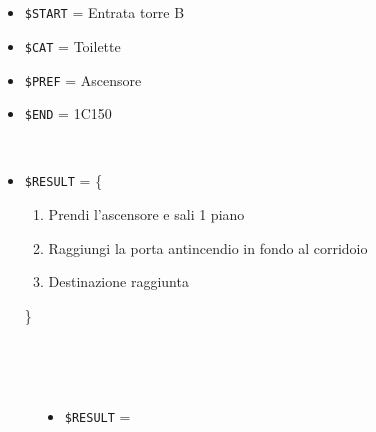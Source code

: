 \documentclass[../../SperimentazioniPratiche.tex]{subfiles}
\begin{document}
			\paragraph*{}	
			\label{2Prova2A.1}
			\begin{tcolorbox}[fonttitle=\bfseries, 
								adjusted title={\Large Prova 2A.1}, 
								breakable, 
								sharp corners=south,
								colback=white, 
								colframe=white!60!black]
								
				\begin{description}[leftmargin=0.7cm,labelwidth=!]
				
					\item[Input] \ \par 
        				\begin{itemize}
        					\item \verb|$START| = Entrata torre B
							\item \verb|$CAT| = Toilette
							\item \verb|$PREF| = Ascensore
        					\item \verb|$END| = 1C150
        				\end{itemize}
        				
        			\tcbline 
        				
        			\item[Output atteso] \ \par
        				\begin{itemize}
        					\item \verb|$RESULT| = \{
        						\begin{enumerate}
        							\item Prendi l'ascensore e sali 1 piano
									\item Raggiungi la porta antincendio in fondo al corridoio
									\item Destinazione raggiunta
        						\end{enumerate}
        					\}
        				\end{itemize}

					\tcbline        				
        				
        			\item[Output riscontrato] \ \par
        				\begin{description}
        				
        					\item[\dispositivoA] \ \par
        					\begin{itemize}
        						\item \verb|$RESULT| = \ok
        					\end{itemize}      					
        					

\end{description}
\end{description}
\end{tcolorbox}
\end{document}
